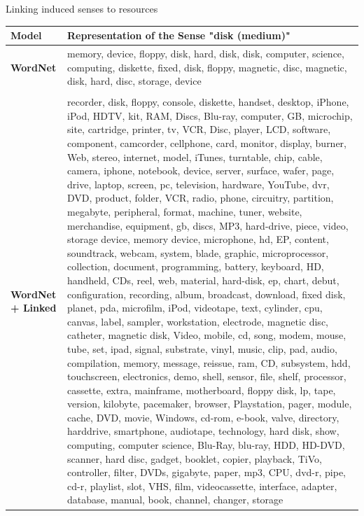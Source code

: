 \begin{frame}{Linking induced senses to resources }


\begin{table}
\tiny
\begin{tabular}{l|p{9cm}} 
\bf Model & \bf Representation of the Sense "disk (medium)"  \\ \hline
\textbf{WordNet}  &  memory, device, floppy, disk, hard, disk, disk, computer, science, computing, diskette, fixed, disk, floppy, magnetic, disc, magnetic, disk, hard, disc,      storage, device \\ \\ \hline 
\textbf{WordNet + Linked} & recorder, disk, floppy, console, diskette, handset, desktop, iPhone, iPod, HDTV, kit, RAM, Discs, Blu-ray, computer, GB, microchip, site, cartridge,          printer, tv, VCR, Disc, player, LCD, software, component, camcorder, cellphone, card, monitor, display, burner, Web, stereo, internet, model, iTunes,         turntable, chip, cable, camera, iphone, notebook, device, server, surface, wafer, page, drive, laptop, screen, pc, television, hardware, YouTube, dvr,        DVD, product, folder, VCR, radio, phone, circuitry, partition, megabyte, peripheral, format, machine, tuner, website, merchandise, equipment, gb, discs,      MP3, hard-drive, piece, video, storage device, memory device, microphone, hd, EP, content, soundtrack, webcam, system, blade, graphic, microprocessor,        collection, document, programming, battery, keyboard, HD, handheld, CDs, reel, web, material, hard-disk, ep, chart, debut, configuration, recording,          album, broadcast, download, fixed disk, planet, pda, microfilm, iPod, videotape, text, cylinder, cpu, canvas, label, sampler, workstation, electrode,         magnetic disc, catheter, magnetic disk, Video, mobile, cd, song, modem, mouse, tube, set, ipad, signal, substrate, vinyl, music, clip, pad, audio,            compilation, memory, message, reissue, ram, CD, subsystem, hdd, touchscreen, electronics, demo, shell, sensor, file, shelf, processor, cassette, extra,       mainframe, motherboard, floppy disk, lp, tape, version, kilobyte, pacemaker, browser, Playstation, pager, module, cache, DVD, movie, Windows, cd-rom, e-book, valve, directory, harddrive, smartphone, audiotape, technology, hard disk, show, computing, computer science, Blu-Ray, blu-ray, HDD, HD-DVD,            scanner, hard disc, gadget, booklet, copier, playback, TiVo, controller, filter, DVDs, gigabyte, paper, mp3, CPU, dvd-r, pipe, cd-r, playlist, slot, VHS,     film, videocassette, interface, adapter, database, manual, book, channel, changer, storage \\ 
\end{tabular}

\end{table}

	
\end{frame}


